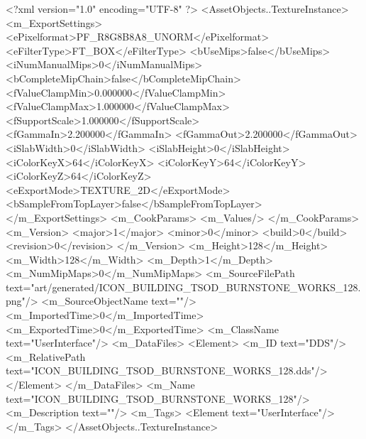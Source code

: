 <?xml version="1.0" encoding="UTF-8" ?>
<AssetObjects..TextureInstance>
	<m_ExportSettings>
		<ePixelformat>PF_R8G8B8A8_UNORM</ePixelformat>
		<eFilterType>FT_BOX</eFilterType>
		<bUseMips>false</bUseMips>
		<iNumManualMips>0</iNumManualMips>
		<bCompleteMipChain>false</bCompleteMipChain>
		<fValueClampMin>0.000000</fValueClampMin>
		<fValueClampMax>1.000000</fValueClampMax>
		<fSupportScale>1.000000</fSupportScale>
		<fGammaIn>2.200000</fGammaIn>
		<fGammaOut>2.200000</fGammaOut>
		<iSlabWidth>0</iSlabWidth>
		<iSlabHeight>0</iSlabHeight>
		<iColorKeyX>64</iColorKeyX>
		<iColorKeyY>64</iColorKeyY>
		<iColorKeyZ>64</iColorKeyZ>
		<eExportMode>TEXTURE_2D</eExportMode>
		<bSampleFromTopLayer>false</bSampleFromTopLayer>
	</m_ExportSettings>
	<m_CookParams>
		<m_Values/>
	</m_CookParams>
	<m_Version>
		<major>1</major>
		<minor>0</minor>
		<build>0</build>
		<revision>0</revision>
	</m_Version>
	<m_Height>128</m_Height>
	<m_Width>128</m_Width>
	<m_Depth>1</m_Depth>
	<m_NumMipMaps>0</m_NumMipMaps>
	<m_SourceFilePath text="art/generated/ICON_BUILDING_TSOD_BURNSTONE_WORKS_128.png"/>
	<m_SourceObjectName text=""/>
	<m_ImportedTime>0</m_ImportedTime>
	<m_ExportedTime>0</m_ExportedTime>
	<m_ClassName text="UserInterface"/>
	<m_DataFiles>
		<Element>
			<m_ID text="DDS"/>
			<m_RelativePath text="ICON_BUILDING_TSOD_BURNSTONE_WORKS_128.dds"/>
		</Element>
	</m_DataFiles>
	<m_Name text="ICON_BUILDING_TSOD_BURNSTONE_WORKS_128"/>
	<m_Description text=""/>
	<m_Tags>
		<Element text="UserInterface"/>
	</m_Tags>
</AssetObjects..TextureInstance>
